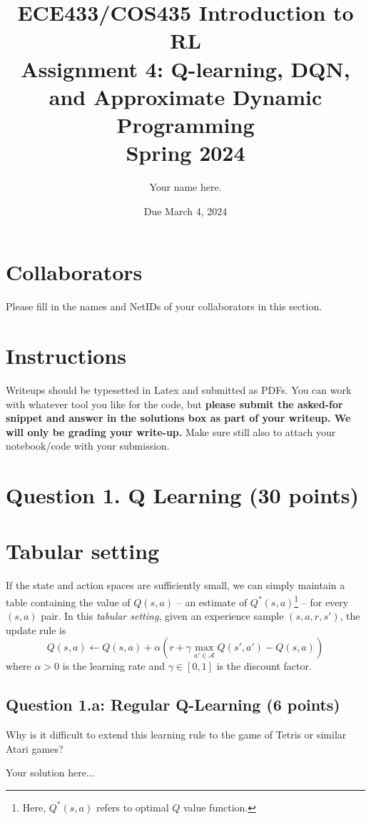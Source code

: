 \documentclass[12pt]{article}
\date{Due March 4, 2024}
\author{\begin{fillme}[width=0.3\textwidth]
 Your name here.
\end{fillme}} %
\title{ECE433/COS435 Introduction to RL\\
  Assignment 4: Q-learning, DQN, and Approximate Dynamic Programming
\\
  Spring 2024\\
}
\begin{document}
  \maketitle
  \section*{Collaborators}
\begin{fillme}
 Please fill in the names and NetIDs of your collaborators in this section.
\end{fillme}

\section*{Instructions}

Writeups should be typesetted in Latex and submitted as PDFs. You can work with whatever tool you like for the code, but \textbf{please submit the asked-for snippet and answer in the solutions box as part of your writeup. We will only be grading your write-up.} Make sure still also to attach your notebook/code with your submission.

\section*{Question 1. Q Learning (30 points)}
\section*{Tabular setting}
If the state and action spaces are sufficiently small, we can simply maintain a table containing the value of $Q(s,a)$ -- an estimate of $Q^*(s,a)$\footnote{Here, $Q^*(s,a)$ refers to optimal $Q$ value function.} -- for every $(s,a)$ pair. In this \textit{tabular setting}, given an experience sample $(s,a,r,s')$, the update rule is
\begin{equation} \label{q-learning-update}
Q(s,a) \leftarrow Q(s,a) + \alpha \left( r + \gamma \max_{a' \in \mathcal{A}} Q(s',a') - Q(s,a) \right)
\end{equation}
where $\alpha > 0$ is the learning rate and $\gamma \in [0, 1]$ is the discount factor.

\subsection*{Question 1.a: Regular Q-Learning (6 points)} Why is it difficult to extend this learning rule to the game of Tetris or similar Atari games?
\begin{solution}
Your solution here...
\end{solution}
\end{document}
